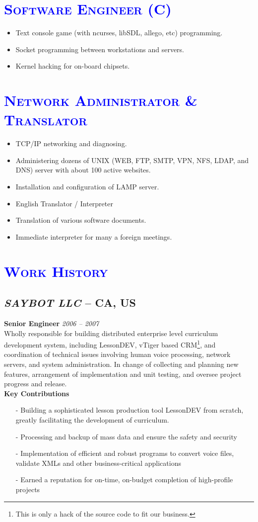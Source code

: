 \documentclass[a4paper,12pt]{article}
\newcommand{\company}[1]{%
  \textsl{#1}}
\newcommand{\ssection}[1]{%
  \section[#1]{\normalsize\scshape\textcolor{blue}{#1}}}
\newcommand{\ssubsection}[1]{%
  \subsection[#1]{\normalsize\textbf #1}}
\begin{document}
\ssection{Software Engineer (C)}
\begin{itemize}
	\item Text console game (with ncurses, libSDL, allego, etc) programming.
	\item Socket programming between workstations and servers.
	\item Kernel hacking for on-board chipsets.
\end{itemize}

\ssection{Network Administrator \& Translator}
\begin{itemize}
	\item TCP/IP networking and diagnosing.
	\item Administering dozens of UNIX (WEB, FTP, SMTP, VPN, NFS, LDAP, and DNS) server with about 100 active websites.
	\item Installation and configuration of LAMP server.
	\item English Translator / Interpreter
	\item Translation of various software documents.
	\item Immediate interpreter for many a foreign meetings.
\end{itemize}

\ssection{Work History}

	\ssubsection{\-\company{SAYBOT LLC} -- CA, US}%
	\textbf{Senior Engineer} \textsl{2006 -- 2007}\\
	Wholly responsible for building distributed enterprise level curriculum development system, including LessonDEV, vTiger based CRM\footnote{This is only a hack of the source code to fit our business.}, and coordination of technical issues involving human voice processing, network servers, and system administration. In change of collecting and planning new features, arrangement of implementation and unit testing, and oversee project progress and release.\\

	\noindent\textbf{Key Contributions}
	\begin{itemize}
		\item[-] Building a sophisticated lesson production tool LessonDEV from scratch, greatly facilitating the development of curriculum. 
		\item[-] Processing and backup of mass data and ensure the safety and security
		\item[-] Implementation of efficient and robust programs to convert voice files, validate XMLs and other business-critical applications
		\item[-] Earned a reputation for on-time, on-budget completion of high-profile projects
	\end{itemize}
\end{document}
